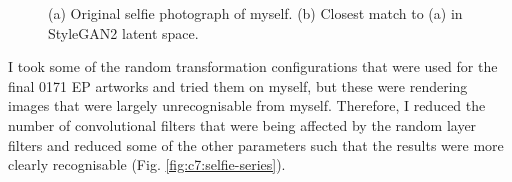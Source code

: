 \begin{figure}[!htbp]
    \hfill
    \hfill
    \caption[Selfie and latent projected into StyleGAN2 latent space comparison]{(a) Original selfie photograph of myself. (b) Closest match to (a) in StyleGAN2 latent space.}
    \label{fig:c7:selfie}
 \end{figure}

I took some of the random transformation configurations that were used for the final 0171 EP artworks and tried them on myself, but these were rendering images that were largely unrecognisable from myself. 
Therefore, I reduced the number of convolutional filters that were being affected by the random layer filters and reduced some of the other parameters such that the results were more clearly recognisable  (Fig. \ref{fig:c7:selfie-series}).


